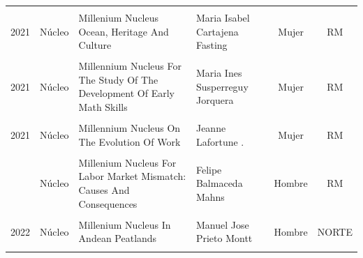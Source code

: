 \documentclass[
  12pt,
  letterpaper,
]{article}
\begin{document}
\begin{table}
{{\begin{tabular}[t]{cc>{\raggedright\arraybackslash}p{7cm}>{\raggedright\arraybackslash}p{3cm}cc}
\cellcolor{gray!10}{2021} & \cellcolor{gray!10}{Núcleo} & \cellcolor{gray!10}{Center For The Study Of Politics, Public Opinion And Media In Chile} & \cellcolor{gray!10}{Patricio Daniel Navia Lucero} & \cellcolor{gray!10}{Hombre} & \cellcolor{gray!10}{RM}\\
2021 & Núcleo & Millenium Nucleus Ocean, Heritage And Culture & Maria Isabel Cartajena Fasting & Mujer & RM\\
\addlinespace
\cellcolor{gray!10}{2021} & \cellcolor{gray!10}{Núcleo} & \cellcolor{gray!10}{Millennium Nucleus For The Evaluation And Analysis Of Drug Policies} & \cellcolor{gray!10}{Alvaro Ernesto Castillo Carniglia} & \cellcolor{gray!10}{Hombre} & \cellcolor{gray!10}{RM}\\
2021 & Núcleo & Millennium Nucleus For The Study Of The Development Of Early Math Skills & Maria Ines Susperreguy Jorquera & Mujer & RM\\
\cellcolor{gray!10}{2021} & \cellcolor{gray!10}{Núcleo} & \cellcolor{gray!10}{Millennium Nucleus On Intergenerational Mobility: From Modelling To Policy} & \cellcolor{gray!10}{Ernesto Javier San Martin Gutierrez} & \cellcolor{gray!10}{Hombre} & \cellcolor{gray!10}{RM}\\
2021 & Núcleo & Millennium Nucleus On The Evolution Of Work & Jeanne Lafortune . & Mujer & RM\\
\cellcolor{gray!10}{2021} & \cellcolor{gray!10}{Núcleo} & \cellcolor{gray!10}{Nucleo Milenio De Sociomedicina} & \cellcolor{gray!10}{Esteban Calvo Bralic} & \cellcolor{gray!10}{Hombre} & \cellcolor{gray!10}{RM}\\
\addlinespace
2022 & Núcleo & Millenium Nucleus For Labor Market Mismatch: Causes And Consequences & Felipe Balmaceda Mahns & Hombre & RM\\
\cellcolor{gray!10}{2022} & \cellcolor{gray!10}{Núcleo} & \cellcolor{gray!10}{Millenium Nucleus For The Study Of The Consequences Of Immigration, The Drivers Of Public Perceptions, And Potential Mismatches Between Reality And Perceptions About Migration In Chile} & \cellcolor{gray!10}{Raimundo Undurraga Riesco} & \cellcolor{gray!10}{Hombre} & \cellcolor{gray!10}{RM}\\
2022 & Núcleo & Millenium Nucleus In Andean Peatlands & Manuel Jose Prieto Montt & Hombre & NORTE\\
\cellcolor{gray!10}{2022} & \cellcolor{gray!10}{Núcleo} & \cellcolor{gray!10}{Millenium Nucleus On The Impacts Of China In Lac} & \cellcolor{gray!10}{Francisco Urdinez Gaviot} & \cellcolor{gray!10}{Hombre} & \cellcolor{gray!10}{RM}\\

\end{tabular}}}
\end{table}
\end{document}
